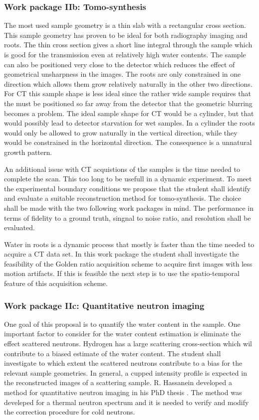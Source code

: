 \documentclass[a4paper,11pt]{scrreprt}
\begin{document}
\subsubsection{Work package IIb: Tomo-synthesis}
The most used sample geometry is a thin slab with a rectangular cross section. 
This sample geometry has proven to be ideal for both radiography imaging and roots. 
The thin cross section gives a short line integral through the sample which is good 
for the transmission even at relatively high water contents. The sample can also be 
positioned very close to the detector which reduces the effect of geometrical unsharpness 
in the images. The roots are only constrained in one direction which allows them grow 
relatively naturally in the other two directions. For CT this sample shape is less ideal 
since the rather wide sample requires that the must be positioned so far away from the 
detector that the geometric blurring becomes a problem. The ideal sample shape for CT 
would be a cylinder, but that would possibly lead to detector starvation for wet samples. 
In a cylinder the roots would only be allowed to grow naturally in the vertical direction, 
while they would be constrained in the horizontal direction. The consequence is a unnatural 
growth pattern. 

An additional issue with CT acquistions of the samples is the time needed to complete the scan. 
This too long to be usefull in a dynamic experiment. To meet the experimental boundary conditions 
we propose that the student shall identify and evaluate a suitable reconstruction method for 
tomo-synthesis.  The choice shall be made with the two following work packages in mind. 
The performance in terms of fidelity to a ground truth, singnal to noise ratio, and resolution 
shall be evaluated.   

Water in roots is a dynamic process that mostly is faster than the time needed to acquire a 
CT data set. In this work package the student shall investigate the feasibility of the Golden 
ratio acquisition scheme to acquire first images with less motion artifacts. If this is 
feasible the next step is to use the spatio-temporal feature 
of this acquisition scheme. 

\subsubsection{Work package IIc: Quantitative neutron imaging }
One goal of this proposal is to quantify the water content in the sample. 
One important factor to consider for the water content estimation is eliminate
the effect scattered neutrons. Hydrogen has a large scattering cross-section 
which wil contribute to a biased estimate of the water content. The student 
shall investigate to which extent the scattered neutrons contribute to a 
bias for the relevant sample geometries. In general, a cupped intensity profile 
is expected in the reconstructed images of a scattering sample. R. Hassanein 
developed a method for quantitative neutron imaging in his PhD thesis \cite{hassanein2006diss}. 
The method was develeped for a thermal neutron spectrum and it is needed 
to verify and modify the correction procedure for cold neutrons. 
\end{document}
